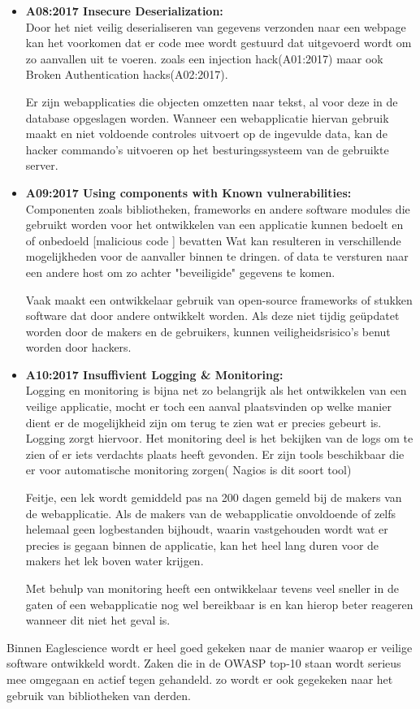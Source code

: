 \begin{itemize}
\item \textbf{A08:2017 Insecure Deserialization:}\\ Door het niet veilig deserialiseren van gegevens verzonden naar een webpage kan het voorkomen dat er code mee wordt gestuurd dat uitgevoerd wordt om zo aanvallen uit te voeren. zoals een injection hack(A01:2017) maar ook Broken Authentication hacks(A02:2017).

Er zijn webapplicaties die objecten omzetten naar tekst, al voor deze in de database opgeslagen worden. Wanneer een webapplicatie hiervan gebruik maakt en niet voldoende controles uitvoert op de ingevulde data, kan de hacker commando’s uitvoeren op het besturingssysteem van de gebruikte server.

\item \textbf{A09:2017 Using components with Known vulnerabilities:}\\
Componenten zoals bibliotheken, frameworks en andere software modules die gebruikt worden voor het ontwikkelen van een applicatie kunnen bedoelt en of onbedoeld [malicious code ] bevatten Wat kan resulteren in verschillende mogelijkheden voor de aanvaller binnen te dringen. of data te versturen naar een andere host om zo achter "beveiligide" gegevens te komen.

Vaak maakt een ontwikkelaar gebruik van open-source frameworks of stukken software dat door andere ontwikkelt worden. Als deze niet tijdig geüpdatet worden door de makers en de gebruikers, kunnen veiligheidsrisico’s benut worden door hackers.

\item \textbf{A10:2017 Insuffivient Logging \& Monitoring:}\\
Logging en monitoring is bijna net zo belangrijk als het ontwikkelen van een veilige applicatie, mocht er toch een aanval plaatsvinden op welke manier dient er de mogelijkheid zijn om terug te zien wat er precies gebeurt is. Logging zorgt hiervoor. Het monitoring deel is het bekijken van de logs om te zien of er iets verdachts plaats heeft gevonden. Er zijn tools beschikbaar die er voor automatische monitoring zorgen( Nagios is dit soort tool)

Feitje, een lek wordt gemiddeld pas na 200 dagen gemeld bij de makers van de webapplicatie. Als de makers van de webapplicatie onvoldoende of zelfs helemaal geen logbestanden bijhoudt, waarin vastgehouden wordt wat er precies is gegaan binnen de applicatie, kan het heel lang duren voor de makers het lek boven water krijgen.

Met behulp van monitoring heeft een ontwikkelaar tevens veel sneller in de gaten of een webapplicatie nog wel bereikbaar is en kan hierop beter reageren wanneer dit niet het geval is.

\end{itemize}
Binnen Eaglescience wordt er heel goed gekeken naar de manier waarop er veilige software ontwikkeld wordt. Zaken die in de OWASP top-10 staan wordt serieus mee omgegaan en actief tegen gehandeld. zo wordt er ook gegekeken naar het gebruik van bibliotheken van derden. 

